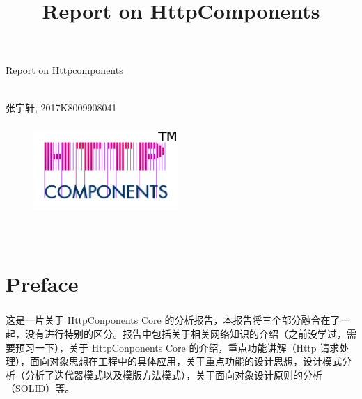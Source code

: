 \documentclass{article}
\begin{document}
	\title{Report on HttpComponents}  %
	\begin{center}
		\huge Report on Httpcomponents\\
		\hspace*{\fill} \\ %
		\begin{CJK}{UTF8}{gbsn}
			\normalsize 张宇轩, 2017K8009908041\\
		\end{CJK}{}
	\end{center}
	\begin{figure}[H]
		\centering
		\includegraphics[height = 3.5cm, width = 5.5cm]{pics/1_httpcomponents.png}	
	\end{figure}

	\hspace*{\fill} \\ %
	
	\tableofcontents{} %
	\clearpage
	\section{Preface}
	\subparagraph{}
	\begin{CJK}{UTF8}{gbsn}
		\indent \indent 这是一片关于 HttpConponents Core 的分析报告，本报告将三个部分融合在了一起，没有进行特别的区分。报告中包括关于相关网络知识的介绍（之前没学过，需要预习一下），关于 HttpConponents Core 的介绍，重点功能讲解（Http 请求处理），面向对象思想在工程中的具体应用，关于重点功能的设计思想，设计模式分析（分析了迭代器模式以及模版方法模式），关于面向对象设计原则的分析（SOLID）等。
	\end{CJK}{}
	\clearpage
	

\end{document}
